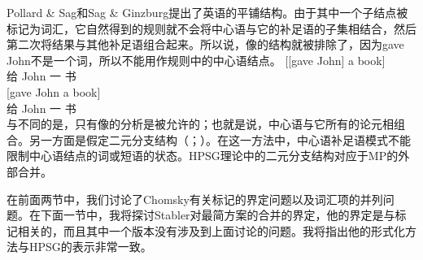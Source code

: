 Pollard \& Sag和Sag \& Ginzburg提出了英语的平铺结构。由于其中一个子结点被标记为词汇，它自然得到的规则就不会将中心语与它的补足语的子集相结合，然后第二次将结果与其他补足语组合起来。所以说，像的结构就被排除了，因为gave John不是一个词，所以不能用作规则中的中心语结点。
\eal
\ex\label{ex-gave-john-a-book-a} 
\gll {}[[gave John] a book]\\
       \hspaceThis{[[}给 John 一 书\\
\ex\label{ex-gave-john-a-book-b} 
\gll {}[gave John a book]\\
       \spacebr{}给 John 一 书\\
\zl
与不同的是，只有像的分析是被允许的；也就是说，中心语与它所有的论元相组合。另一方面是假定二元分支结构（\citealp{MuellerHPSGHandbook}；\citealp[\S~1.2.2]{MOeDanish}）。在这一方法中，中心语补足语模式不能限制中心语结点的词或短语的状态。HPSG理论中的二元分支结构对应于MP的外部合并。

在前面两节中，我们讨论了Chomsky有关标记的界定问题以及词汇项的并列问题。在下面一节中，我将探讨Stabler对最简方案的合并的界定，他的界定是与标记相关的，而且其中一个版本没有涉及到上面讨论的问题。我将指出他的形式化方法与HPSG的表示非常一致。

